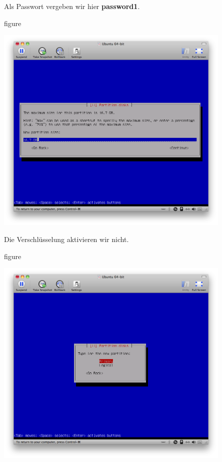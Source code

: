 \pagebreak
Als Passwort vergeben wir hier \textbf{password1}.

\begin{nofloat}{figure}
\begin{center}
\includegraphics[width=0.85\textwidth]{screenshots/23_ubuntu_install.png}
\end{center}
\end{nofloat}

Die Verschlüsselung aktivieren wir nicht.

\begin{nofloat}{figure}
\begin{center}
\includegraphics[width=0.85\textwidth]{screenshots/24_ubuntu_install.png}
\end{center}
\end{nofloat}

